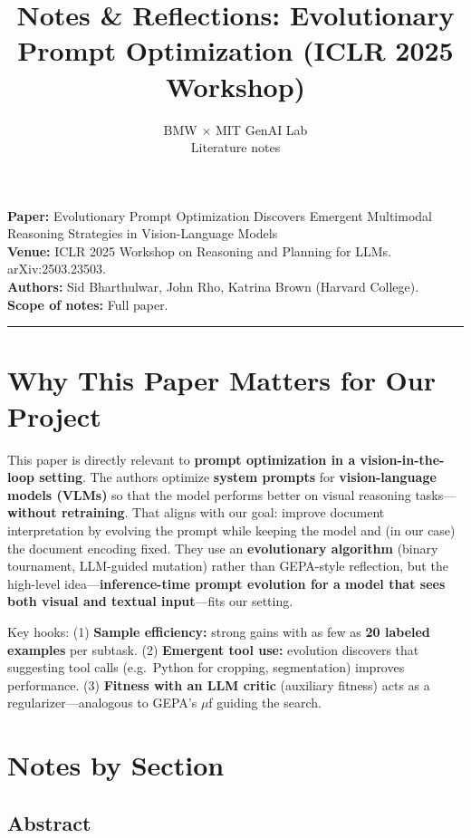 \documentclass[11pt,a4paper]{article}
\title{Notes \& Reflections: Evolutionary Prompt Optimization (ICLR 2025 Workshop)}
\author{BMW $\times$ MIT GenAI Lab\\Literature notes}
\date{}
\begin{document}
\maketitle
\vspace{0.5em}

\textbf{Paper:} Evolutionary Prompt Optimization Discovers Emergent Multimodal Reasoning Strategies in Vision-Language Models\\
\textbf{Venue:} ICLR 2025 Workshop on Reasoning and Planning for LLMs. arXiv:2503.23503.\\
\textbf{Authors:} Sid Bharthulwar, John Rho, Katrina Brown (Harvard College).\\
\textbf{Scope of notes:} Full paper.

\vspace{0.5em}
\hrule
\vspace{0.5em}

\section{Why This Paper Matters for Our Project}

This paper is directly relevant to \textbf{prompt optimization in a vision-in-the-loop setting}. The authors optimize \textbf{system prompts} for \textbf{vision-language models (VLMs)} so that the model performs better on visual reasoning tasks---\textbf{without retraining}. That aligns with our goal: improve document interpretation by evolving the prompt while keeping the model and (in our case) the document encoding fixed. They use an \textbf{evolutionary algorithm} (binary tournament, LLM-guided mutation) rather than GEPA-style reflection, but the high-level idea---\textbf{inference-time prompt evolution for a model that sees both visual and textual input}---fits our setting.

Key hooks: (1) \textbf{Sample efficiency:} strong gains with as few as \textbf{20 labeled examples} per subtask. (2) \textbf{Emergent tool use:} evolution discovers that suggesting tool calls (e.g.\ Python for cropping, segmentation) improves performance. (3) \textbf{Fitness with an LLM critic} (auxiliary fitness) acts as a regularizer---analogous to GEPA's $\mu$f guiding the search.

\section{Notes by Section}

\subsection{Abstract}
\end{document}
